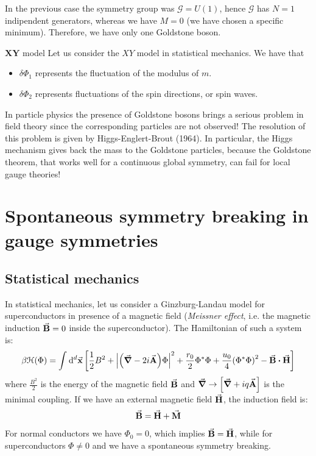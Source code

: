 \documentclass[../main/main.tex]{subfiles}
\begin{document}
In the previous case the symmetry group was \( \mathcal{G} = U (1) \), hence \( \mathcal{G} \) has \( N=1 \) indipendent generators, whereas we have \( M=0 \) (we have chosen a specific minimum). Therefore, we have only one Goldstone boson.


\begin{example}{\(\pmb{XY}\) model}{}
Let us consider the \( XY \) model in statistical mechanics. We have that
\begin{itemize}
\item \( \delta \Phi _1 \) represents the fluctuation of the modulus of \( m \).
\item \( \delta \Phi _2 \) represents fluctuations of the spin directions, or spin waves.
\end{itemize}
\end{example}

\begin{remark}
In particle physics the presence of Goldstone bosons brings a serious problem in field theory since the corresponding particles are not observed! The resolution of this problem is given by Higgs-Englert-Brout (1964). In particular, the Higgs mechanism gives back the mass to the Goldstone particles, because the Goldstone theorem, that works well for a continuous global symmetry, can fail for local gauge theories!
\end{remark}



\section{Spontaneous symmetry breaking in gauge symmetries}

\subsection{Statistical mechanics}

In statistical mechanics, let us consider a Ginzburg-Landau model for superconductors in presence of a magnetic field (\emph{Meissner effect}, i.e. the magnetic induction \( \va{B} = 0 \) inside the superconductor). The Hamiltonian of such a system is:
\begin{equation}
  \beta \mathcal{H} (\Phi ) = \int_{}^{} \dd[d]{\va{x}} \qty[\frac{1}{2}B^2 + \abs{\qty(\va{\grad }- 2 i \va{A})\Phi  }^2 + \frac{r_0}{2} \Phi ^* \Phi
  + \frac{u_0}{4} \qty(\Phi ^* \Phi )^2 - \va{B} \vdot \va{H}]
\end{equation}
where \( \frac{B^2}{2} \) is the energy of the magnetic field \( \va{B} \) and \( \va{\grad } \rightarrow \qty[\va{\grad } + i q \va{A}]  \) is the minimal coupling.
If we have an external magnetic field \( \va{H} \), the induction field is:
\begin{equation*}
  \va{B} = \va{H} + \va{M}
\end{equation*}
For normal conductors we have \( \Phi _0 = 0 \), which implies \( \va{B} = \va{H} \), while for superconductors \( \Phi \neq 0 \) and we have a spontaneous symmetry breaking.
\end{document}
